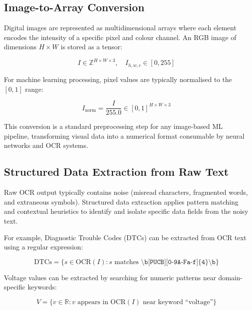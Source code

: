 \documentclass[10pt,a4paper]{article}
\begin{document}
\subsection{Image-to-Array Conversion}
\label{sec:image-to-array}

Digital images are represented as multidimensional arrays where each element encodes the intensity of a specific pixel and colour channel. An RGB image of dimensions $H \times W$ is stored as a tensor:

\begin{equation}
I \in \mathbb{Z}^{H \times W \times 3}, \quad I_{h,w,c} \in [0, 255]
\label{eq:image-tensor}
\end{equation}

For machine learning processing, pixel values are typically normalised to the $[0, 1]$ range:

\begin{equation}
I_{\text{norm}} = \frac{I}{255.0} \in [0, 1]^{H \times W \times 3}
\label{eq:image-norm}
\end{equation}

This conversion is a standard preprocessing step for any image-based ML pipeline, transforming visual data into a numerical format consumable by neural networks and OCR systems.

\subsection{Structured Data Extraction from Raw Text}
\label{sec:structured-extraction}

Raw OCR output typically contains noise (misread characters, fragmented words, and extraneous symbols). Structured data extraction applies pattern matching and contextual heuristics to identify and isolate specific data fields from the noisy text.

For example, Diagnostic Trouble Codes (DTCs) can be extracted from OCR text using a regular expression:

\begin{equation}
\text{DTCs} = \{s \in \text{OCR}(I) : s \text{ matches } \texttt{\textbackslash b[PUCB][0-9A-Fa-f]\{4\}\textbackslash b}\}
\label{eq:dtc-extraction}
\end{equation}

Voltage values can be extracted by searching for numeric patterns near domain-specific keywords:

\begin{equation}
V = \{v \in \mathbb{R} : v \text{ appears in OCR}(I) \text{ near keyword ``voltage''}\}
\label{eq:voltage-extraction}
\end{equation}
\end{document}
